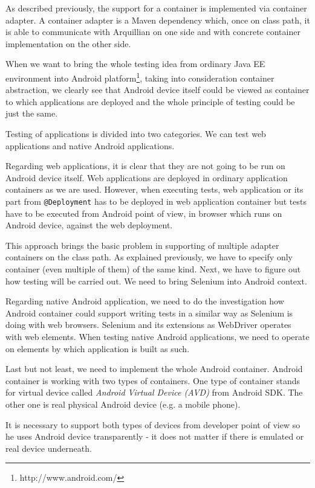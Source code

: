 \documentclass[12pt,final,oneside]{fithesis}
\begin{document}
As described previously, the support for a container is implemented via container adapter. A container adapter is a Maven dependency which, once on class path, it is able to communicate with Arquillian on one side and with concrete container implementation on the other side.

When we want to bring the whole testing idea from ordinary Java EE environment into Android platform\footnote{http://www.android.com/}, taking into consideration container abstraction, we clearly see that Android device itself could be viewed as container to which applications are deployed and the whole principle of testing could be just the same.

Testing of applications is divided into two categories. We can test web applications and native Android applications.

Regarding web applications, it is clear that they are not going to be run on Android device itself. Web applications are deployed in ordinary application containers as we are used. However, when executing tests, web application or its part from \texttt{@Deployment} has to be deployed in web application container but tests have to be executed from Android point of view, in browser which runs on Android device, against the web deployment.

This approach brings the basic problem in supporting of multiple adapter containers on the class path. As explained previously, we have to specify only container (even multiple of them) of the same kind. Next, we have to figure out how testing will be carried out. We need to bring Selenium into Android context.

Regarding native Android application, we need to do the investigation how Android container could support writing tests in a similar way as Selenium is doing with web browsers. Selenium and its extensions as WebDriver operates with web elements. When testing native Android applications, we need to operate on elements by which application is built as such.

Last but not least, we need to implement the whole Android container. Android container is working with two types of containers. One type of container stands for virtual device called \textit{Android Virtual Device (AVD)}\cite{bib081} from Android SDK. The other one is real physical Android device (e.g. a mobile phone).

It is necessary to support both types of devices from developer point of view so he uses Android device transparently - it does not matter if there is emulated or real device underneath. 
\end{document}
